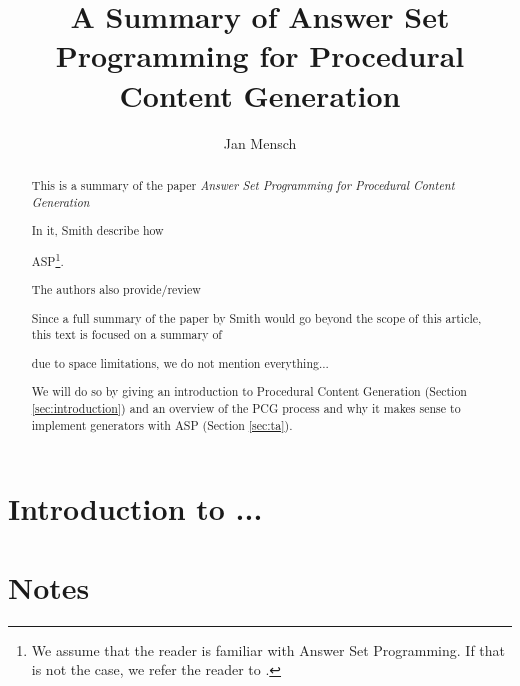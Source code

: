 \documentclass[runningheads]{llncs}
\newcommand{\papertitle}{Answer Set Programming for Procedural Content Generation}
\newcommand{\authorquote}{Smith \etal}
\begin{document}
\title{A Summary of \papertitle}

\author{Jan Mensch}




%
\maketitle              %


\begin{abstract}
This is a summary of the paper \textit{\papertitle} 

In it, \authorquote{} describe how

ASP\footnote{We assume that the reader is familiar with Answer Set Programming. If that is not the case, we refer the reader to \cite{erdem2016applications}.}. 

The authors also provide/review

Since a full summary of the paper by \authorquote{} would go beyond the scope of this article, this text is focused on a summary of

due to space limitations, we do not mention everything...

We will do so by giving an introduction to Procedural Content Generation (Section \ref{sec:introduction}) and an overview of the PCG process and why it makes sense to implement generators with ASP (Section \ref{sec:ta}). 

\end{abstract}


\section{Introduction to ...} \label{sec:introduction}



\section{Notes}
\end{document}
